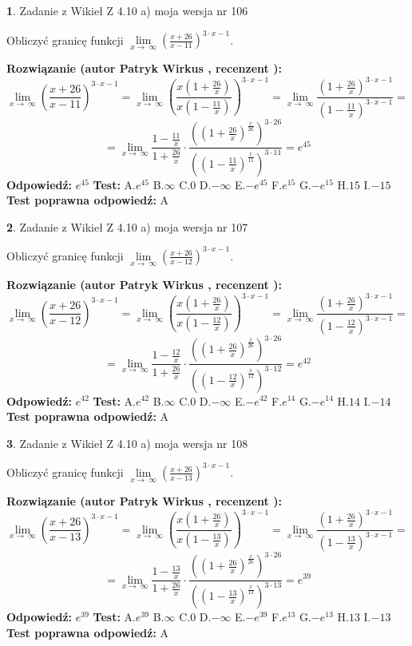 \documentclass[12pt, a4paper]{article}
\theoremstyle{definition} %
\newtheorem{zad}{}
\newcommand{\zadStart}[1]{\begin{zad}#1\newline}
\newcommand{\zadStop}{\end{zad}}
\newcommand{\rozwStart}[2]{\noindent \textbf{Rozwiązanie (autor #1 , recenzent #2): }\newline}
\newcommand{\rozwStop}{\newline}
\newcommand{\odpStart}{\noindent \textbf{Odpowiedź:}\newline}
\newcommand{\odpStop}{\newline}
\newcommand{\testStart}{\noindent \textbf{Test:}\newline}
\newcommand{\testStop}{\newline}
\newcommand{\kluczStart}{\noindent \textbf{Test poprawna odpowiedź:}\newline}
\newcommand{\kluczStop}{\newline}
\begin{document}
\zadStart{Zadanie z Wikieł Z 4.10 a) moja wersja nr 106}

Obliczyć granicę funkcji  $\lim\limits_{x\to\ \infty}(\frac{x+26}{x-11})^{3\cdot x-1}$.
\zadStop
\rozwStart{Patryk Wirkus}{}
$$\lim\limits_{x\to\ \infty}(\frac{x+26}{x-11})^{3\cdot x-1} = \lim\limits_{x\to\ \infty}(\frac{x(1+\frac{26}{x})}{x(1-\frac{11}{x})})^{3\cdot x-1}=\lim\limits_{x\to\ \infty}\frac{(1+\frac{26}{x})^{3\cdot x-1}}{(1-\frac{11}{x})^{3\cdot x-1}}=$$
$$=\lim\limits_{x\to\ \infty}\frac{1-\frac{11}{x}}{1+\frac{26}{x}}\cdot\frac{((1+\frac{26}{x})^{\frac{x}{26}})^{3\cdot26}}{((1-\frac{11}{x})^{\frac{x}{11}})^{3\cdot11}}=e^{45}$$
\rozwStop
\odpStart
$e^{45}$
\odpStop
\testStart
A.$e^{45}$ B.$\infty$ C.$0$ D.$-\infty$ E.$-e^{45}$
F.$e^{15}$ G.$-e^{15}$
H.$15$
I.$-15$
\testStop
\kluczStart
A
\kluczStop



\zadStart{Zadanie z Wikieł Z 4.10 a) moja wersja nr 107}

Obliczyć granicę funkcji  $\lim\limits_{x\to\ \infty}(\frac{x+26}{x-12})^{3\cdot x-1}$.
\zadStop
\rozwStart{Patryk Wirkus}{}
$$\lim\limits_{x\to\ \infty}(\frac{x+26}{x-12})^{3\cdot x-1} = \lim\limits_{x\to\ \infty}(\frac{x(1+\frac{26}{x})}{x(1-\frac{12}{x})})^{3\cdot x-1}=\lim\limits_{x\to\ \infty}\frac{(1+\frac{26}{x})^{3\cdot x-1}}{(1-\frac{12}{x})^{3\cdot x-1}}=$$
$$=\lim\limits_{x\to\ \infty}\frac{1-\frac{12}{x}}{1+\frac{26}{x}}\cdot\frac{((1+\frac{26}{x})^{\frac{x}{26}})^{3\cdot26}}{((1-\frac{12}{x})^{\frac{x}{12}})^{3\cdot12}}=e^{42}$$
\rozwStop
\odpStart
$e^{42}$
\odpStop
\testStart
A.$e^{42}$ B.$\infty$ C.$0$ D.$-\infty$ E.$-e^{42}$
F.$e^{14}$ G.$-e^{14}$
H.$14$
I.$-14$
\testStop
\kluczStart
A
\kluczStop



\zadStart{Zadanie z Wikieł Z 4.10 a) moja wersja nr 108}

Obliczyć granicę funkcji  $\lim\limits_{x\to\ \infty}(\frac{x+26}{x-13})^{3\cdot x-1}$.
\zadStop
\rozwStart{Patryk Wirkus}{}
$$\lim\limits_{x\to\ \infty}(\frac{x+26}{x-13})^{3\cdot x-1} = \lim\limits_{x\to\ \infty}(\frac{x(1+\frac{26}{x})}{x(1-\frac{13}{x})})^{3\cdot x-1}=\lim\limits_{x\to\ \infty}\frac{(1+\frac{26}{x})^{3\cdot x-1}}{(1-\frac{13}{x})^{3\cdot x-1}}=$$
$$=\lim\limits_{x\to\ \infty}\frac{1-\frac{13}{x}}{1+\frac{26}{x}}\cdot\frac{((1+\frac{26}{x})^{\frac{x}{26}})^{3\cdot26}}{((1-\frac{13}{x})^{\frac{x}{13}})^{3\cdot13}}=e^{39}$$
\rozwStop
\odpStart
$e^{39}$
\odpStop
\testStart
A.$e^{39}$ B.$\infty$ C.$0$ D.$-\infty$ E.$-e^{39}$
F.$e^{13}$ G.$-e^{13}$
H.$13$
I.$-13$
\testStop
\kluczStart
A
\kluczStop
\end{document}
